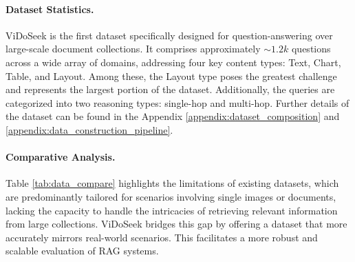 \paragraph{Dataset Statistics.} ViDoSeek is the first dataset specifically designed for question-answering over large-scale document collections. It comprises approximately $\sim 1.2k$ questions across a wide array of domains, addressing four key content types: Text, Chart, Table, and Layout. Among these, the Layout type poses the greatest challenge and represents the largest portion of the dataset. Additionally, the queries are categorized into two reasoning types: single-hop and multi-hop. Further details of the dataset can be found in the Appendix \ref{appendix:dataset_composition} and \ref{appendix:data_construction_pipeline}.

\paragraph{Comparative Analysis.}
Table \ref{tab:data_compare} highlights the limitations of existing datasets, which are predominantly tailored for scenarios involving single images or documents, lacking the capacity to handle the intricacies of retrieving relevant information from large collections. ViDoSeek bridges this gap by offering a dataset that more accurately mirrors real-world scenarios. This facilitates a more robust and scalable evaluation of RAG systems.

